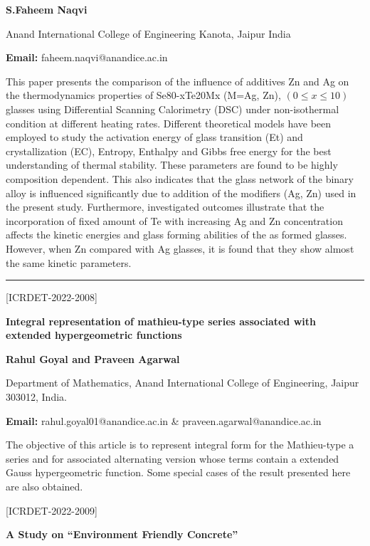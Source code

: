 \documentclass[twoside,11pt]{amsart}
\begin{document}
\centerline{\textbf{S.Faheem Naqvi  }}
\newpage
\vskip 5mm
\begin{flushleft}
Anand International College of Engineering Kanota, Jaipur India
\vskip 5mm
\end{flushleft}
\vskip 2mm
\begin{flushleft}
{\bf Email:} faheem.naqvi@anandice.ac.in
\end{flushleft}
\vskip 5mm
This paper presents the comparison of the influence of additives Zn and Ag on the thermodynamics properties of Se80-xTe20Mx (M=Ag, Zn), $(0\leq x\leq10)$ glasses using Differential Scanning Calorimetry (DSC) under non-isothermal condition at different heating rates. Different theoretical models have been employed to study the activation energy of glass transition (Et) and crystallization (EC), Entropy, Enthalpy and Gibbs free energy for the best understanding of thermal stability. These parameters are found to be highly composition dependent. This also indicates that the glass network of the binary alloy is influenced significantly due to addition of the modifiers (Ag, Zn) used in the present study. Furthermore, investigated outcomes illustrate that the incorporation of fixed amount of Te with increasing Ag and Zn concentration affects the kinetic energies and glass forming abilities of the as formed glasses. However, when Zn compared with Ag glasses, it is found that they show almost the same kinetic parameters.
\vskip 2mm
\rule{\textwidth}{0.5pt}
\vskip 5mm
\begin{flushleft}
\centerline{[ICRDET-2022-2008]}
\end{flushleft}
\begin{center}\bf\LARGE
Integral representation of mathieu-type series
associated with extended hypergeometric functions
\end{center}
\vskip 5mm

\centerline{\textbf{Rahul Goyal and Praveen Agarwal
 }}
\vskip 5mm
\begin{flushleft}
Department of Mathematics, Anand International College of Engineering,
Jaipur 303012, India.
\vskip 5mm
\end{flushleft}
\vskip 2mm
\begin{flushleft}
{\bf Email:} rahul.goyal01@anandice.ac.in \&
praveen.agarwal@anandice.ac.in
\end{flushleft}
\vskip 5mm
The objective of this article is to represent integral form for the Mathieu-type
a series and for associated alternating version whose terms contain a extended
Gauss hypergeometric function. Some special cases of the result presented here are
also obtained.
\newpage
\vskip 5mm
\begin{flushleft}
\centerline{[ICRDET-2022-2009]}
\end{flushleft}
\begin{center}\bf\LARGE
A Study on “Environment Friendly Concrete”
\end{center}
\vskip 5mm
\end{document}
